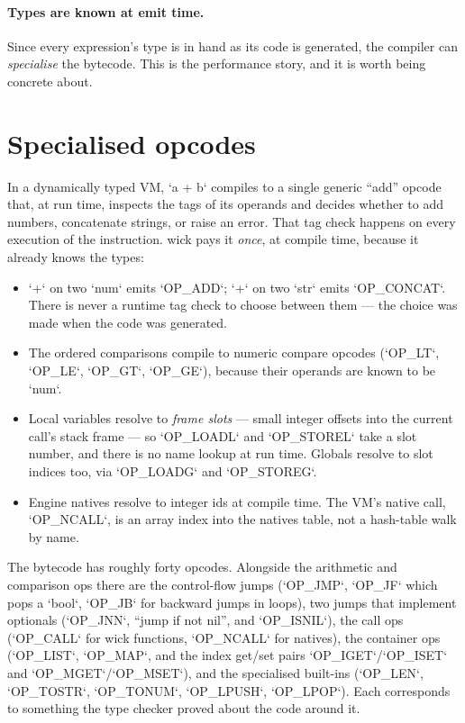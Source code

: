 \paragraph{Types are known at emit time.} Since every expression's type is in
hand as its code is generated, the compiler can \emph{specialise} the
bytecode. This is the performance story, and it is worth being concrete about.

\section{Specialised opcodes}

In a dynamically typed VM, `a + b` compiles to a single generic ``add''
opcode that, at run time, inspects the tags of its operands and decides
whether to add numbers, concatenate strings, or raise an error. That tag check
happens on every execution of the instruction. wick pays it \emph{once}, at
compile time, because it already knows the types:

\begin{itemize}
\item `+` on two `num` emits `OP_ADD`; `+` on two `str` emits `OP_CONCAT`.
There is never a runtime tag check to choose between them --- the choice was
made when the code was generated.
\item The ordered comparisons compile to numeric compare opcodes
(`OP_LT`, `OP_LE`, `OP_GT`, `OP_GE`), because their operands are known to be
`num`.
\item Local variables resolve to \emph{frame slots} --- small integer offsets
into the current call's stack frame --- so `OP_LOADL` and `OP_STOREL` take a
slot number, and there is no name lookup at run time. Globals resolve to slot
indices too, via `OP_LOADG` and `OP_STOREG`.
\item Engine natives resolve to integer ids at compile time. The VM's native
call, `OP_NCALL`, is an array index into the natives table, not a hash-table
walk by name.
\end{itemize}

\noindent
The bytecode has roughly forty opcodes. Alongside the arithmetic and
comparison ops there are the control-flow jumps (`OP_JMP`, `OP_JF` which pops a
`bool`, `OP_JB` for backward jumps in loops), two jumps that implement
optionals (`OP_JNN`, ``jump if not nil'', and `OP_ISNIL`), the call ops
(`OP_CALL` for wick functions, `OP_NCALL` for natives), the container ops
(`OP_LIST`, `OP_MAP`, and the index get/set pairs `OP_IGET`/`OP_ISET` and
`OP_MGET`/`OP_MSET`), and the specialised built-ins (`OP_LEN`, `OP_TOSTR`,
`OP_TONUM`, `OP_LPUSH`, `OP_LPOP`). Each corresponds to something the
type checker proved about the code around it.

